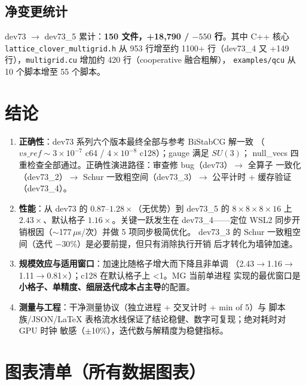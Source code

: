 \documentclass[11pt,a4paper]{article}
\begin{document}
\subsection{净变更统计}
\label{sec:ev-stats}

dev73 $\to$ dev73\_5 累计：\textbf{150 文件，+18{,}790 / $-550$ 行}。其中
C++ 核心 \texttt{lattice\_clover\_multigrid.h} 从 953 行增至约 1100+ 行（dev73\_4 又
+149 行），\texttt{multigrid.cu} 增加约 420 行（cooperative 融合粗解），
\texttt{examples/qcu} 从 10 个脚本增至 55 个脚本。

\section{结论}
\label{sec:conclusion}

\begin{enumerate}
  \item \textbf{正确性}：dev73 系列六个版本最终全部与参考 BiStabCG 解一致
        （$vs\_ref\sim3\times10^{-7}$ c64 / $4\times10^{-8}$ c128）；gauge 满足 $SU(3)$；
        null\_vecs 四重检查全部通过。正确性演进路径：审查修 bug（dev73）$\to$ 全算子
        一致化（dev73\_2）$\to$ Schur 一致粗空间（dev73\_3）$\to$ 公平计时 + 缓存验证
        （dev73\_4）。
  \item \textbf{性能}：从 dev73 的 $0.87$--$1.28\times$（无优势）到 dev73\_5 的
        $8\times8\times8\times16$ 上 $2.43\times$、默认格子 $1.16\times$。关键一跃发生在
        dev73\_4——定位 WSL2 同步开销根因（$\sim$177\,$\mu$s/次）并做 5 项同步极简优化。
        dev73\_3 的 Schur 一致粗空间（迭代 $-30\%$）是必要前提，但只有消除执行开销
        后才转化为墙钟加速。
  \item \textbf{规模效应与适用窗口}：加速比随格子增大而下降且非单调
        （2.43$\to$1.16$\to$1.11$\to$0.81$\times$）；c128 在默认格子上 <1。MG 当前单进程
        实现的最优窗口是\textbf{小格子、单精度、细层迭代成本占主导}的配置。
  \item \textbf{测量与工程}：干净测量协议（独立进程 + 交叉计时 + min of 5）与
        脚本族/JSON/LaTeX 表格流水线保证了结论稳健、数字可复现；绝对耗时对 GPU 时钟
        敏感（$\pm$10\%），迭代数与解精度为稳健指标。
\end{enumerate}

\appendix
\section{图表清单（所有数据图表）}
\label{app:figs}
\end{document}
